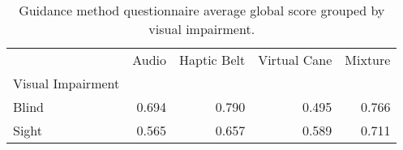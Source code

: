 
\begin{table}[!htb]
\centering
\caption{Guidance method questionnaire average global score grouped by visual impairment.}
\label{tab:questionnaire_average_group}
\begin{tabular}{lrrrr}
\toprule
{} &  Audio &  Haptic Belt &  Virtual Cane &  Mixture \\
Visual Impairment &        &              &               &          \\
\midrule
Blind             &  0.694 &        0.790 &         0.495 &    0.766 \\
Sight             &  0.565 &        0.657 &         0.589 &    0.711 \\
\bottomrule
\end{tabular}
\end{table}


